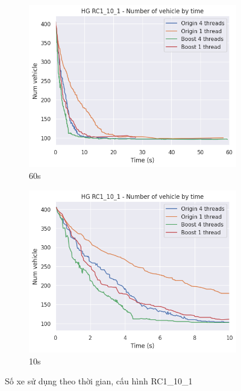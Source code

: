 \begin{figure}[H] %
  \label{fig:perf_ct_rc1}
  \begin{subfigure}{.5\textwidth}
    \centering
    \includegraphics[width=1\linewidth]{figures/nv_time_60s_RC1_10_1.png}
    \caption{60s}
    \label{fig:perf_ct_rc1_60s}
  \end{subfigure}%
  \begin{subfigure}{.5\textwidth}
    \centering
    \includegraphics[width=1\linewidth]{figures/nv_time_10s_RC1_10_1.png}
    \caption{10s}
    \label{fig:perf_ct_rc1_10s}
  \end{subfigure}
  \caption{Số xe sử dụng theo thời gian, cấu hình RC1\_10\_1}
\end{figure}

